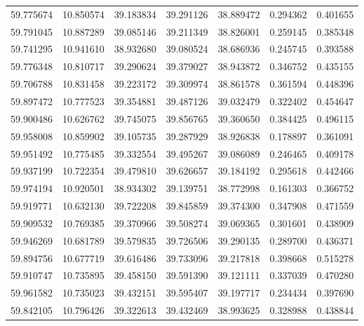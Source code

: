 \begin{tabular}{rrrrrrr}
 59.775674 &  10.850574 &         39.183834 &         39.291126 &         38.889472 &  0.294362 &  0.401655 \\
 59.791045 &  10.887289 &         39.085146 &         39.211349 &         38.826001 &  0.259145 &  0.385348 \\
 59.741295 &  10.941610 &         38.932680 &         39.080524 &         38.686936 &  0.245745 &  0.393588 \\
 59.776348 &  10.810717 &         39.290624 &         39.379027 &         38.943872 &  0.346752 &  0.435155 \\
 59.706788 &  10.831458 &         39.223172 &         39.309974 &         38.861578 &  0.361594 &  0.448396 \\
 59.897472 &  10.777523 &         39.354881 &         39.487126 &         39.032479 &  0.322402 &  0.454647 \\
 59.900486 &  10.626762 &         39.745075 &         39.856765 &         39.360650 &  0.384425 &  0.496115 \\
 59.958008 &  10.859902 &         39.105735 &         39.287929 &         38.926838 &  0.178897 &  0.361091 \\
 59.951492 &  10.775485 &         39.332554 &         39.495267 &         39.086089 &  0.246465 &  0.409178 \\
 59.937199 &  10.722354 &         39.479810 &         39.626657 &         39.184192 &  0.295618 &  0.442466 \\
 59.974194 &  10.920501 &         38.934302 &         39.139751 &         38.772998 &  0.161303 &  0.366752 \\
 59.919771 &  10.632130 &         39.722208 &         39.845859 &         39.374300 &  0.347908 &  0.471559 \\
 59.909532 &  10.769385 &         39.370966 &         39.508274 &         39.069365 &  0.301601 &  0.438909 \\
 59.946269 &  10.681789 &         39.579835 &         39.726506 &         39.290135 &  0.289700 &  0.436371 \\
 59.894756 &  10.677719 &         39.616486 &         39.733096 &         39.217818 &  0.398668 &  0.515278 \\
 59.910747 &  10.735895 &         39.458150 &         39.591390 &         39.121111 &  0.337039 &  0.470280 \\
 59.961582 &  10.735023 &         39.432151 &         39.595407 &         39.197717 &  0.234434 &  0.397690 \\
 59.842105 &  10.796426 &         39.322613 &         39.432469 &         38.993625 &  0.328988 &  0.438844 \\

\end{tabular}
